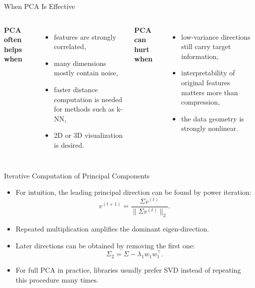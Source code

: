 \begin{frame}{When PCA Is Effective}
\begin{columns}[T]
\textbf{PCA often helps when}
\begin{itemize}
  \item features are strongly correlated,
  \pause
  \item many dimensions mostly contain noise,
  \pause
  \item faster distance computation is needed for methods such as k-NN,
  \pause
  \item 2D or 3D visualization is desired.
\end{itemize}

\pause
{}
\textbf{PCA can hurt when}
\begin{itemize}
  \item low-variance directions still carry target information,
  \pause
  \item interpretability of original features matters more than compression,
  \pause
  \item the data geometry is strongly nonlinear.
\end{itemize}
\end{columns}
\end{frame}

\begin{frame}{Iterative Computation of Principal Components}
\begin{itemize}
  \item For intuition, the leading principal direction can be found by power iteration:
  \begin{equation}
    v^{(t+1)} = \frac{\Sigma v^{(t)}}{\|\Sigma v^{(t)}\|_2}.
    \label{eq:power-iteration}
  \end{equation}
  \pause
  \item Repeated multiplication amplifies the dominant eigen-direction.
  \pause
  \item Later directions can be obtained by removing the first one:
  \begin{equation}
    \Sigma_2 = \Sigma - \lambda_1 w_1 w_1^\top.
    \label{eq:deflation}
  \end{equation}
  \pause
  \item For full PCA in practice, libraries usually prefer SVD instead of repeating this procedure many times.
\end{itemize}
\end{frame}

